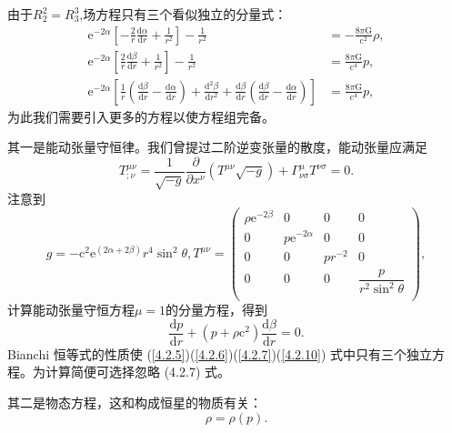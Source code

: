\documentclass[11pt, a4paper, oneside, onecolumn]{ctexart}
\numberwithin{equation}{subsection}
\begin{document}
由于$R^{2}_{2}=R^{3}_{3}$,场方程只有三个看似独立的分量式：
\begin{align}
\mathrm{e}^{-2\alpha}\left[-\frac{2}{r}\frac{\mathrm{d}\alpha}{\mathrm{d}r}+\frac{1}{r^{2}}\right]-\frac{1}{r^{2}}&=-\frac{8\pi\mathrm{G}}{\mathrm{c}^{2}}\rho,\label{4.2.5}\\
\mathrm{e}^{-2\alpha}\left[\frac{2}{r}\frac{\mathrm{d}\beta}{\mathrm{d}r}+\frac{1}{r^{2}}\right]-\frac{1}{r^{2}}&=\frac{8\pi\mathrm{G}}{\mathrm{c}^{4}}p,\label{4.2.6}\\
\mathrm{e}^{-2\alpha}\left[\frac{1}{r}\left(\frac{\mathrm{d}\beta}{\mathrm{d}r}-\frac{\mathrm{d}\alpha}{\mathrm{d}r}\right)+\frac{\mathrm{d}^{2}\beta}{\mathrm{d}r^{2}}+\frac{\mathrm{d}\beta}{\mathrm{d}r}\left(\frac{\mathrm{d}\beta}{\mathrm{d}r}-\frac{\mathrm{d}\alpha}{\mathrm{d}r}\right)\right]&=\frac{8\pi\mathrm{G}}{\mathrm{c}^{4}}p,\label{4.2.7}
\end{align}
为此我们需要引入更多的方程以使方程组完备。

其一是能动张量守恒律。我们曾提过二阶逆变张量的散度，能动张量应满足
\begin{equation}
T^{\mu\nu}_{;\nu}=\frac{1}{\sqrt{-g}}\frac{\partial{}}{\partial{}x^{\nu}}\left(T^{\mu\nu}\sqrt{-g}\right)+\Gamma^{\mu}_{\nu\sigma}T^{\nu\sigma}=0.
\end{equation}
注意到
\begin{equation}
g=-\mathrm{c}^{2}\mathrm{e}^{\left(2\alpha+2\beta\right)}r^{4}\sin^{2}\theta,T^{\mu\nu}=
\begin{pmatrix}
\rho \mathrm{e}^{-2\beta} & 0 & 0 & 0\\
0 & p\mathrm{e}^{-2\alpha} & 0 & 0\\
0 & 0 & pr^{-2} & 0\\
0 & 0 & 0 & \dfrac{p}{r^{2}\sin^{2}\theta}\\
\end{pmatrix},
\end{equation}
计算能动张量守恒方程$\mu=1$的分量方程，得到
\begin{equation}
\frac{\mathrm{d}p}{\mathrm{d}r}+\left(p+\rho \mathrm{c}^{2}\right)\frac{\mathrm{d}\beta}{\mathrm{d}r}=0.\label{4.2.10}
\end{equation}
Bianchi 恒等式的性质使 (\ref{4.2.5})(\ref{4.2.6})(\ref{4.2.7})(\ref{4.2.10}) 式中只有三个独立方程。为计算简便可选择忽略 (4.2.7) 式。

其二是物态方程，这和构成恒星的物质有关：
\begin{equation}
\rho=\rho\left(p\right).
\end{equation}
\end{document}
